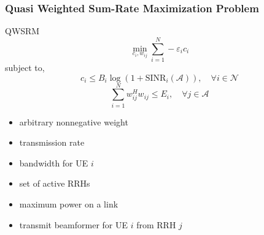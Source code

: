 \documentclass[usenames,dvipsnames]{beamer}
\begin{document}
\begin{frame}
  \frametitle{Quasi Weighted Sum-Rate Maximization Problem}
  \begin{exampleblock}{QWSRM}
    \[
      \min_{c_{i},w_{ij}} \sum_{i=1}^{N}-\varepsilon_{i}c_{i}
    \]
    subject to,
    \[
      c_{i} \leq B_{i}\log(1+\text{SINR}_{i}(\mathcal{A})),\quad \forall i\in \mathcal{N}
    \]
    \[
      \sum_{i=1}^{N}w_{ij}^{H}w_{ij}\leq E_{i},\quad \forall j\in \mathcal{A}
    \]
  \end{exampleblock}
  \begin{itemize}
    \item { arbitrary nonnegative weight}
    \item { transmission rate}
    \item { bandwidth for UE $i$}
    \item { set of active RRHs}
    \item { maximum power on a link}
    \item { transmit beamformer for UE $i$ from RRH $j$}
  \end{itemize}
\end{frame}
\end{document}
